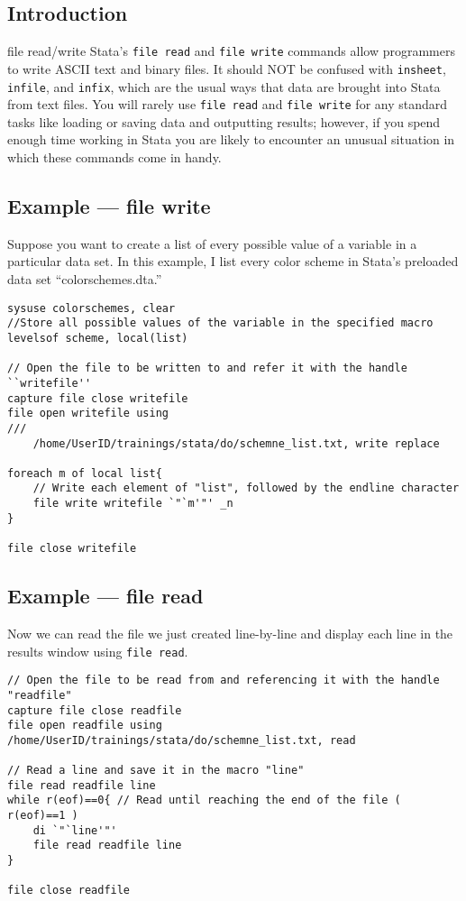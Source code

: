 \documentclass[fleqn, handout, 10pt]{beamer}
\def\lst{\lstinline}
\begin{document}
\subsection{Introduction}

\begin{frame}[fragile]{file read/write}
    Stata's \lst=file read= and \lst=file write= commands allow programmers to write ASCII text and binary files. It should NOT be confused with \lst=insheet=, \lst=infile=, and \lst=infix=, which are the usual ways that data are brought into Stata from text files. You will rarely use \lst=file read= and \lst=file write= for any standard tasks like loading or saving data and outputting results; however, if you spend enough time working in Stata you are likely to encounter an unusual situation in which these commands come in handy.
\end{frame}

\subsection{Example --- file write}

\begin{frame}[fragile]
    Suppose you want to create a list of every possible value of a variable in a particular data set. In this example, I list every color scheme in Stata's preloaded data set ``colorschemes.dta.''
    \begin{lstlisting}
sysuse colorschemes, clear
//Store all possible values of the variable in the specified macro
levelsof scheme, local(list)

// Open the file to be written to and refer it with the handle ``writefile''
capture file close writefile
file open writefile using                                              ///
    /home/UserID/trainings/stata/do/schemne_list.txt, write replace

foreach m of local list{
    // Write each element of "list", followed by the endline character
    file write writefile `"`m'"' _n
}

file close writefile
    \end{lstlisting}
\end{frame}

\subsection{Example --- file read}
\begin{frame}[fragile]
    Now we can read the file we just created line-by-line and display each line in the results window using \lst=file read=.
    \begin{lstlisting}
// Open the file to be read from and referencing it with the handle "readfile"
capture file close readfile
file open readfile using /home/UserID/trainings/stata/do/schemne_list.txt, read

// Read a line and save it in the macro "line"
file read readfile line
while r(eof)==0{ // Read until reaching the end of the file ( r(eof)==1 )
    di `"`line'"'
    file read readfile line
}

file close readfile
    \end{lstlisting}
\end{frame}
\end{document}
